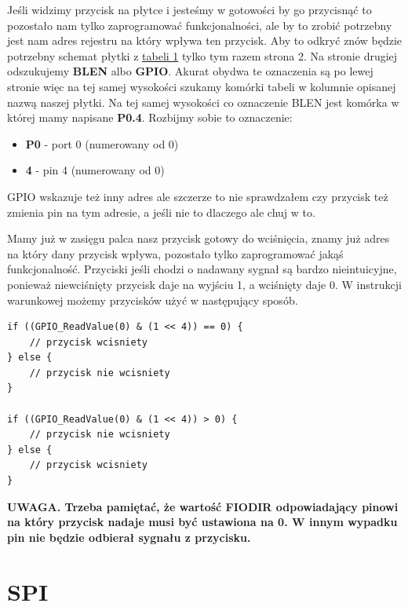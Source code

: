 \documentclass[11pt]{article}
\begin{document}
Jeśli widzimy przycisk na płytce i jesteśmy w gotowości by go przycisnąć to pozostało
nam tylko zaprogramować funkcjonalności, ale by to zrobić potrzebny jest nam adres
rejestru na który wpływa ten przycisk. Aby to odkryć znów będzie potrzebny schemat
płytki z \hyperref[tab:tab1]{tabeli 1} tylko tym razem strona 2. Na stronie drugiej
odszukujemy \textbf{BL\textunderscore EN} albo \textbf{GPIO}.
Akurat obydwa te oznaczenia są po lewej stronie więc na tej samej wysokości szukamy
komórki tabeli w kolumnie opisanej nazwą naszej płytki. Na tej samej wysokości co 
oznaczenie BL\textunderscore EN jest komórka w której mamy napisane \textbf{P0.4}.
Rozbijmy sobie to oznaczenie:
\begin{itemize}
    \item \textbf{P0} - port 0 (numerowany od 0)
    \item \textbf{4} - pin 4 (numerowany od 0)
\end{itemize}
GPIO wskazuje też inny adres ale szczerze to nie sprawdzałem czy 
przycisk też zmienia pin na tym adresie, a jeśli nie to dlaczego ale chuj w to.

Mamy już w zasięgu palca nasz przycisk gotowy do wciśnięcia, znamy już adres na który
dany przycisk wpływa, pozostało tylko zaprogramować jakąś funkcjonalność. 
Przyciski jeśli chodzi o nadawany sygnał są bardzo nieintuicyjne, ponieważ niewciśnięty
przycisk daje na wyjściu 1, a wciśnięty daje 0. 
\newpage
W instrukcji warunkowej możemy przycisków użyć w następujący sposób.
\begin{lstlisting}
if ((GPIO_ReadValue(0) & (1 << 4)) == 0) {
    // przycisk wcisniety
} else {
    // przycisk nie wcisniety
}

if ((GPIO_ReadValue(0) & (1 << 4)) > 0) {
    // przycisk nie wcisniety
} else {
    // przycisk wcisniety
}
\end{lstlisting}
\textbf{UWAGA. Trzeba pamiętać, że wartość FIODIR odpowiadający pinowi na który
przycisk nadaje musi być ustawiona na 0. W innym wypadku pin nie będzie odbierał sygnału
z przycisku.}

\section{SPI}
\end{document}

